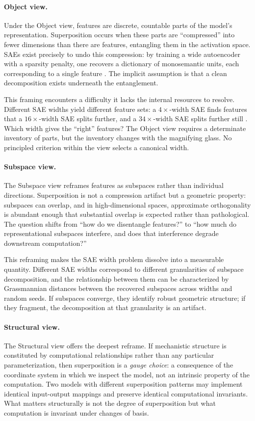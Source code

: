 \documentclass{article}
\begin{document}
\paragraph{Object view.}
Under the Object view, features are discrete, countable parts of the model's representation. Superposition occurs when these parts are ``compressed'' into fewer dimensions than there are features, entangling them in the activation space. SAEs exist precisely to undo this compression: by training a wide autoencoder with a sparsity penalty, one recovers a dictionary of monosemantic units, each corresponding to a single feature \citep{bricken2023}. The implicit assumption is that a clean decomposition exists underneath the entanglement.

This framing encounters a difficulty it lacks the internal resources to resolve. Different SAE widths yield different feature sets: a $4\times$-width SAE finds features that a $16\times$-width SAE splits further, and a $34\times$-width SAE splits further still \citep{templeton2024}. Which width gives the ``right'' features? The Object view requires a determinate inventory of parts, but the inventory changes with the magnifying glass. No principled criterion within the view selects a canonical width.

\paragraph{Subspace view.}
The Subspace view reframes features as subspaces rather than individual directions. Superposition is not a compression artifact but a geometric property: subspaces can overlap, and in high-dimensional spaces, approximate orthogonality is abundant enough that substantial overlap is expected rather than pathological. The question shifts from ``how do we disentangle features?'' to ``how much do representational subspaces interfere, and does that interference degrade downstream computation?''

This reframing makes the SAE width problem dissolve into a measurable quantity. Different SAE widths correspond to different granularities of subspace decomposition, and the relationship between them can be characterized by Grassmannian distances between the recovered subspaces across widths and random seeds. If subspaces converge, they identify robust geometric structure; if they fragment, the decomposition at that granularity is an artifact.

\paragraph{Structural view.}
The Structural view offers the deepest reframe. If mechanistic structure is constituted by computational relationships rather than any particular parameterization, then superposition is a \emph{gauge choice}: a consequence of the coordinate system in which we inspect the model, not an intrinsic property of the computation. Two models with different superposition patterns may implement identical input-output mappings and preserve identical computational invariants. What matters structurally is not the degree of superposition but what computation is invariant under changes of basis.
\end{document}
